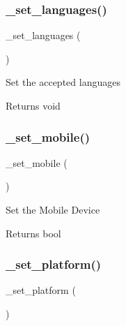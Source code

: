 \subsubsection{\texorpdfstring{\+\_\+set\+\_\+languages()}{\_set\_languages()}}
{\footnotesize\ttfamily \+\_\+set\+\_\+languages (\begin{DoxyParamCaption}{ }\end{DoxyParamCaption})\hspace{0.3cm}{\ttfamily [protected]}}

Set the accepted languages

\begin{DoxyReturn}{Returns}
void 
\end{DoxyReturn}
\mbox{\label{class_c_i___user__agent_aa2b84face2c8bd1830f618bf9a57f196}} 
\subsubsection{\texorpdfstring{\+\_\+set\+\_\+mobile()}{\_set\_mobile()}}
{\footnotesize\ttfamily \+\_\+set\+\_\+mobile (\begin{DoxyParamCaption}{ }\end{DoxyParamCaption})\hspace{0.3cm}{\ttfamily [protected]}}

Set the Mobile Device

\begin{DoxyReturn}{Returns}
bool 
\end{DoxyReturn}
\mbox{\label{class_c_i___user__agent_a3e3af24bc0adb0483c3965765b28a25b}} 
\subsubsection{\texorpdfstring{\+\_\+set\+\_\+platform()}{\_set\_platform()}}
{\footnotesize\ttfamily \+\_\+set\+\_\+platform (\begin{DoxyParamCaption}{ }\end{DoxyParamCaption})\hspace{0.3cm}{\ttfamily [protected]}}

